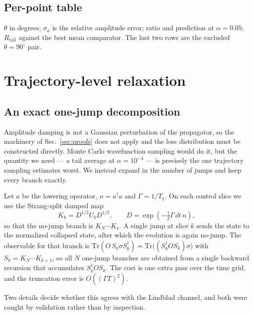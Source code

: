 \documentclass[aps,pra,onecolumn,notitlepage,superscriptaddress,nofootinbib,floatfix]{revtex4-2}
\newcommand{\Rt}{R_{\mathrm{tail}}}
\begin{document}
\subsection{Per-point table}
$\theta$ in degrees; $\sigma_a$ is the relative amplitude error; ratio and
prediction at $\alpha=0.05$; $\Rt$ against the best mean comparator. The last
two rows are the excluded $\theta=90^\circ$ pair.
\begin{center}\footnotesize\setlength{\tabcolsep}{4pt}

\end{center}

\section{Trajectory-level relaxation}
\label{sec:stage5}

\subsection{An exact one-jump decomposition}
Amplitude damping is not a Gaussian perturbation of the propagator, so the
machinery of Sec.~\ref{sec:proofs} does not apply and the loss distribution
must be constructed directly. Monte Carlo wavefunction sampling would do it,
but the quantity we need --- a tail average at $\alpha=10^{-4}$ --- is
precisely the one trajectory sampling estimates worst. We instead expand in
the number of jumps and keep every branch exactly.

Let $a$ be the lowering operator, $n=a^\dagger a$ and $\Gamma=1/T_1$. On each
control slice we use the Strang-split damped map
\begin{equation}
K_k=D^{1/2}U_kD^{1/2},\qquad D=\exp(-\tfrac{1}{2}\Gamma\,dt\,n),
\label{eq:damped}
\end{equation}
so that the no-jump branch is $K_{N}\cdots K_1$. A single jump at slice $k$
sends the state to the normalized collapsed state, after which the evolution
is again no-jump. The observable for that branch is
$\mathrm{Tr}(O\,S_k\sigma S_k^\dagger)=\mathrm{Tr}\big((S_k^\dagger OS_k)\sigma\big)$
with $S_k=K_N\cdots K_{k+1}$, so all $N$ one-jump branches are obtained from a
single backward recursion that accumulates $S_k^\dagger OS_k$. The cost is one
extra pass over the time grid, and the truncation error is $O((\Gamma T)^2)$.

Two details decide whether this agrees with the Lindblad channel, and both
were caught by validation rather than by inspection.
\end{document}
